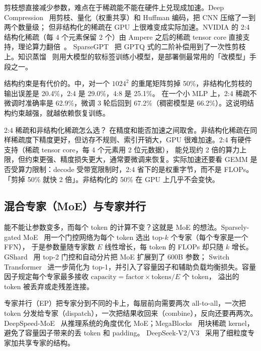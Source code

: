 剪枝想直接减少参数，难点在于稀疏能不能在硬件上兑现成加速。Deep Compression~\cite{han2016deep} 用剪枝、量化（权重共享）和 Huffman 编码，把 CNN 压缩了一到两个数量级；
但非结构化的稀疏在 GPU 上很难变成实际加速。NVIDIA 的 2:4 结构化稀疏（每 4 个元素保留 2 个）由 Ampere 之后的稀疏 tensor core 直接支持，理论算力翻倍~\cite{mishra2021accelerating}。
SparseGPT~\cite{frantar2023sparsegpt} 把 GPTQ 式的二阶补偿用到了一次性剪枝上。知识蒸馏~\cite{hinton2015distilling} 则用大模型的软标签训练小模型，是部署侧最常用的「改模型」手段之一。

结构约束是有代价的。中，对一个 $1024^2$ 的重尾矩阵剪掉 50\%，非结构化剪枝的输出误差是 20.4\%，2:4 是 29.0\%，4:8 是 25.1\%。
在一个小 MLP 上，2:4 稀疏不微调时准确率是 62.9\%，微调 3 轮后回到 67.2\%（稠密模型是 66.2\%）。这说明结构约束越强，就越依赖恢复训练。

\begin{qa}{2:4 稀疏和非结构化稀疏怎么选？}
\ans 在精度和能否加速之间取舍。非结构化稀疏在同样稀疏度下精度更好，但访存不规则、索引开销大，GPU 很难加速。2:4 有硬件支持（稀疏 tensor core，每 4 个元素用 2 位元数据），
能兑现约 2 倍的算力上限，但约束更强、精度损失更大，通常要微调来恢复。实际加速还要看 GEMM 是否受算力限制：decode 受带宽限制时，2:4 省下的是权重字节，而不是 FLOPs。
\wrong 「剪掉 50\% 就快 2 倍」。非结构化的 50\% 在 GPU 上几乎不会变快。
\end{qa}

\subsection{混合专家（MoE）与专家并行}

能不能让参数变多，而每个 token 的计算不变？这就是 MoE 的想法。Sparsely-gated MoE~\cite{shazeer2017outrageously} 用一个门控网络为每个 token 选出 top-$k$ 个专家（每个专家是一个 FFN），
于是参数量随专家数 $E$ 线性增长，每 token 的 FLOPs 却只随 $k$ 增长。GShard~\cite{lepikhin2021gshard} 用 top-2 门控和自动分片把 MoE 扩展到了 600B 参数；
Switch Transformer~\cite{fedus2022switch} 进一步简化为 top-1，并引入了容量因子和辅助负载均衡损失。容量因子规定每个专家最多接收 $\text{capacity}=\text{factor}\times\text{tokens}/E$ 个 token，
溢出的 token 被丢弃或走残差连接。

专家并行（EP）把专家分到不同的卡上，每层前向需要两次 all-to-all，一次把 token 分发给专家（dispatch），一次把结果收回来（combine），反向还要再两次。
DeepSpeed-MoE~\cite{rajbhandari2022deepspeed} 从推理系统的角度优化 MoE；MegaBlocks~\cite{gale2023megablocks} 用块稀疏 kernel，避免了容量因子带来的丢 token 和 padding。
DeepSeek-V2/V3~\cite{deepseekai2024v2,deepseekai2024v3} 采用了细粒度专家加共享专家的结构。

